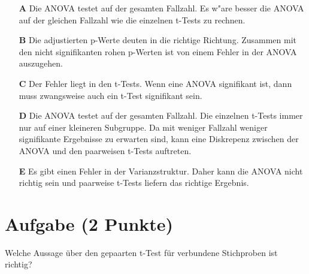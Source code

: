 \documentclass[a4paper, 10pt]{scrartcl}\usepackage[]{graphicx}\usepackage[]{color}
\begin{document}
\begin{enumerate}
\item [\textbf{A} \msquare] Die ANOVA testet auf der gesamten Fallzahl. Es w{"a}re besser die ANOVA auf der gleichen Fallzahl wie die einzelnen t-Tests zu rechnen.
\item [\textbf{B} \msquare] Die adjustierten p-Werte deuten in die richtige Richtung. Zusammen mit den nicht signifikanten rohen p-Werten ist von einem Fehler in der ANOVA auszugehen.
\item [\textbf{C} \msquare] Der Fehler liegt in den t-Tests. Wenn eine ANOVA signifikant ist, dann muss zwangsweise auch ein t-Test signifikant sein.
\item [\textbf{D} \msquare] Die ANOVA testet auf der gesamten Fallzahl. Die einzelnen t-Tests immer nur auf einer kleineren Subgruppe. Da mit weniger Fallzahl weniger signifikante Ergebnisse zu erwarten sind, kann eine Diskrepenz zwischen der ANOVA und den paarweisen t-Tests auftreten.
\item [\textbf{E} \msquare] Es gibt einen Fehler in der Varianzstruktur. Daher kann die ANOVA nicht richtig sein und paarweise t-Tests liefern das richtige Ergebnis.
\end{enumerate} 

\section{Aufgabe \hfill (2 Punkte)}

Welche Aussage über den gepaarten t-Test für verbundene Stichproben ist richtig?
\end{document}
